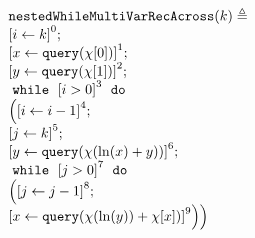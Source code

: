  \begin{figure}
    \centering
    {\footnotesize
    \begin{subfigure}{.5\textwidth}
    \begin{centering}
    $ 
    \begin{array}{l}
      \kw{nestedWhileMultiVarRecAcross}(k) \triangleq \\
      \clabel{\assign{i}{k} }^{0} ; \\
      \clabel{ \assign{x}{\query(\chi[0])}}^{1} ; \\
      \clabel{ \assign{y}{\query(\chi[1])}}^{2} ; \\
          \ewhile ~ \clabel{i > 0}^{3} ~ \edo ~ \\
          \Big(
           \clabel{\assign{i}{i-1}}^{4} ;\\
           \clabel{\assign{j}{k}}^{5} ;\\
           \clabel{\assign{y}{\query(\chi(\ln(x) + y))} }^{6}  ; \\
           \ewhile ~ \clabel{j > 0}^{7} ~ \edo ~ \\
           \Big(
            \clabel{\assign{j}{j-1}}^{8};\\
            \clabel{\assign{x}{\query(\chi(\ln(y))+\chi[x])} }^{9}
            \Big) \Big)
      \end{array}
    $
    \caption{}
    \end{centering}
    \end{subfigure}
    \quad
    \begin{subfigure}{.42\textwidth}
      \begin{centering}
\end{centering}
\end{subfigure}}
\end{figure}
